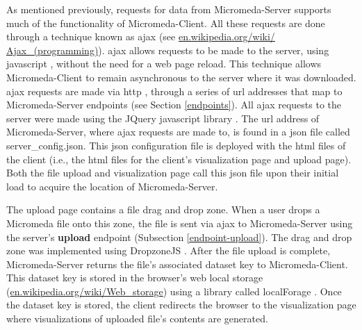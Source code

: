 As mentioned previously, requests for data from Micromeda-Server supports much 
of the functionality of Micromeda-Client. All these requests are done through a 
technique known as \gls{ajax} \cite{garrett2005ajax,li2012jquery} (see 
\href{http://en.wikipedia.org/wiki/Ajax_(programming)}{en.wikipedia.org/wiki/ 
Ajax\_(programming)}). \gls{ajax} allows requests to be made to the server, 
using \gls{javascript} \cite{flanagan2006javascript}, without the need for a web 
page reload. This technique allows Micromeda-Client to remain asynchronous to 
the server where it was downloaded. \gls{ajax} requests are made via \gls{http} 
\cite{fielding1999hypertext}, through a series of \gls{url} addresses 
\cite{berners1994rfc} that map to Micromeda-Server endpoints (see Section 
\ref{endpoints}). All \gls{ajax} requests to the server were made using the 
JQuery \gls{javascript} library \cite{chaffer2013learning,li2012jquery}. The 
\gls{url} address of Micromeda-Server, where \gls{ajax} requests are made to, is 
found in a \gls{json} file called server\_config.json. This \gls{json} 
configuration file is deployed with the \gls{html} files of the client (i.e., 
the \gls{html} files for the client's visualization page and upload page). Both 
the file upload and visualization page call this \gls{json} file upon their 
initial load to acquire the location of Micromeda-Server.

The upload page contains a file drag and drop zone. When a user drops a 
Micromeda file onto this zone, the file is sent via \gls{ajax} to Micromeda-Server 
using the server's \textbf{upload} endpoint (Subsection \ref{endpoint-upload}). 
The drag and drop zone was implemented using DropzoneJS \cite{meno}. After the 
file upload is complete, Micromeda-Server returns the file's associated dataset 
key to Micromeda-Client. This dataset key is stored in the browser's web local 
storage \cite{Hickson} 
(\href{http://en.wikipedia.org/wiki/Web_storage}{en.wikipedia.org/wiki/Web\_storage}) 
using a library called localForage \cite{localforage}. Once the dataset key is 
stored, the client redirects the browser to the visualization page where 
visualizations of uploaded file's contents are generated.

